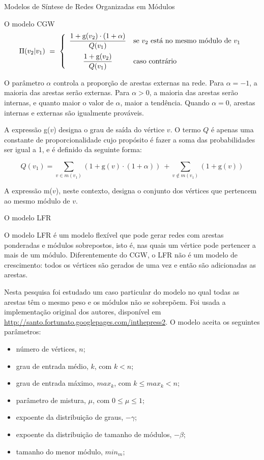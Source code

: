 \begin{section}{Modelos de Síntese de Redes Organizadas em Módulos}
\begin{subsection}{O modelo CGW}
$$
\Pi (v_2|v_1) ~=~
\left\{
\begin{array}{cl}
\dfrac{1 + \mathrm{g}(v_2) \cdot (1 + \alpha)}{Q(v_1)} 
  & \mbox{se $v_2$ está no mesmo módulo de $v_1$} \vspace{0.5em} \\ 
\dfrac{1 + \mathrm{g}(v_2)}{Q(v_1)} 
  & \mbox{caso contrário}
\end{array}
\right.
$$

O parâmetro $\alpha$ controla a proporção de arestas externas na rede. Para $\alpha = -1$, a maioria das arestas serão externas. Para $\alpha > 0$, a maioria das arestas serão internas, e quanto maior o valor de $\alpha$, maior a tendência. Quando $\alpha = 0$, arestas internas e externas são igualmente prováveis.

A expressão g($v$) designa o grau de saída do vértice $v$. O termo $Q$ é apenas uma constante de proporcionalidade cujo propósito é fazer a soma das probabilidades ser igual a 1, e é definido da seguinte forma:

$$
Q(v_1) = \sum_{v \in m(v_1)} (1 + \mathrm{g}(v) \cdot (1 + \alpha))
~+ \sum_{v \notin m(v_1)} (1 + \mathrm{g}(v))
$$

A expressão m($v$), neste contexto, designa o conjunto dos vértices que pertencem ao mesmo módulo de $v$.

\end{subsection}

\begin{subsection}{O modelo LFR}

O modelo LFR \cite{Lancichinetti2008,Lancichinetti2009} é um modelo flexível que pode gerar redes com arestas ponderadas e módulos sobrepostos, isto é, nas quais um vértice pode pertencer a mais de um módulo. Diferentemente do CGW, o LFR não é um modelo de crescimento: todos os vértices são gerados de uma vez e então são adicionadas as arestas.

Nesta pesquisa foi estudado um caso particular do modelo no qual todas as arestas têm o mesmo peso e os módulos não se sobrepõem. Foi usada a implementação original dos autores, disponível em  \url{http://santo.fortunato.googlepages.com/inthepress2}. O modelo aceita os seguintes parâmetros:

\begin{itemize}
\item número de vértices, $n$;
\item grau de entrada médio, $k$, com $k < n$;
\item grau de entrada máximo, $max_k$, com $k \le max_k < n$;
\item parâmetro de mistura, $\mu$, com $0 \le \mu \le 1$;
\item expoente da distribuição de graus, $-\gamma$;
\item expoente da distribuição de tamanho de módulos, $-\beta$;
\item tamanho do menor módulo, $min_m$;
\end{itemize}


\end{subsection}
\end{section}
